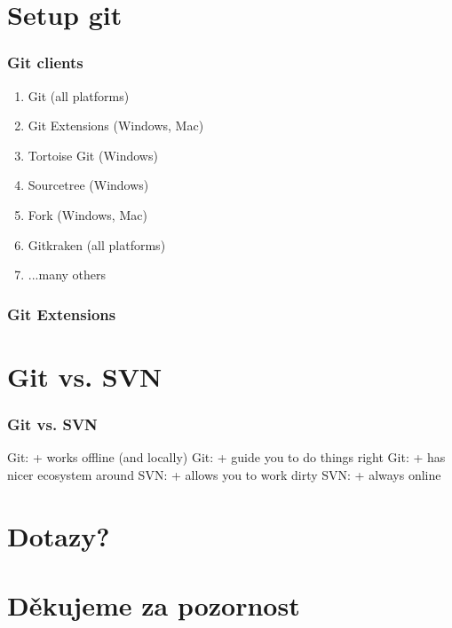 \documentclass{beamer}
\begin{document}
    \section{Setup git}
    \begin{frame}
        \frametitle{Git clients}
        \begin{enumerate}
            \item Git (all platforms)
            \item Git Extensions (Windows, Mac)
            \item Tortoise Git (Windows)
            \item Sourcetree (Windows)
            \item Fork (Windows, Mac)
            \item Gitkraken (all platforms)
            \item ...many others
        \end{enumerate}
    \end{frame}
    \begin{frame}
        \frametitle{Git Extensions}
        
    \end{frame}
    
    \section{Git vs. SVN}
    \begin{frame}
        \frametitle{Git vs. SVN}
        Git: + works offline (and locally)
        Git: + guide you to do things right
        Git: + has nicer ecosystem around
        SVN: + allows you to work dirty
        SVN: + always online
    \end{frame}
    
    \begin{frame}
    \end{frame}
    \section{Dotazy?}
    \section{Děkujeme za pozornost}
\end{document}
